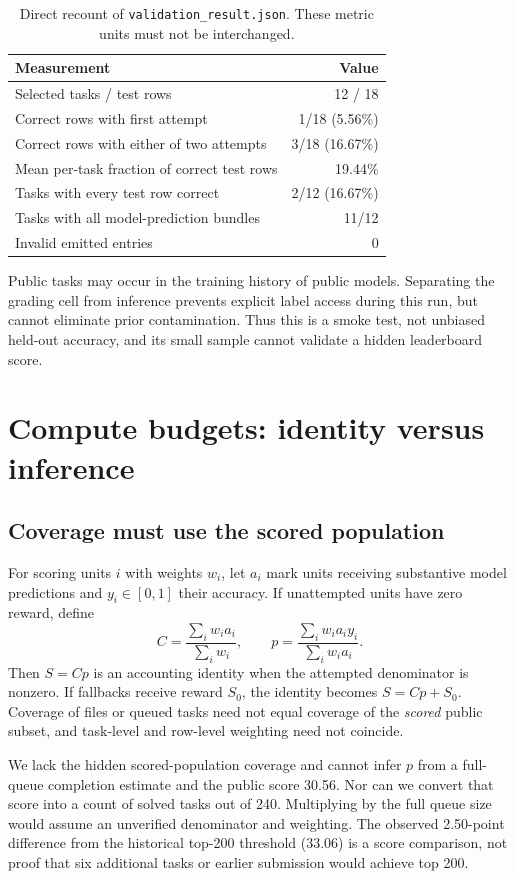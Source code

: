 \documentclass[10pt,a4paper]{article}
\begin{document}
\begin{table}[ht]
\centering
\caption{Direct recount of \texttt{validation\_result.json}. These metric units must not be interchanged.}
\label{tab:smoke}
\begin{tabular}{lr}
\toprule
Measurement & Value\\
\midrule
Selected tasks / test rows & 12 / 18\\
Correct rows with first attempt & 1/18 (5.56\%)\\
Correct rows with either of two attempts & 3/18 (16.67\%)\\
Mean per-task fraction of correct test rows & 19.44\%\\
Tasks with every test row correct & 2/12 (16.67\%)\\
Tasks with all model-prediction bundles & 11/12\\
Invalid emitted entries & 0\\
\bottomrule
\end{tabular}
\end{table}

Public tasks may occur in the training history of public models. Separating the grading cell from inference prevents explicit label access during this run, but cannot eliminate prior contamination. Thus this is a smoke test, not unbiased held-out accuracy, and its small sample cannot validate a hidden leaderboard score.

\section{Compute budgets: identity versus inference}
\subsection{Coverage must use the scored population}
For scoring units $i$ with weights $w_i$, let $a_i$ mark units receiving substantive model predictions and $y_i\in[0,1]$ their accuracy. If unattempted units have zero reward, define
\[
C=\frac{\sum_iw_i a_i}{\sum_iw_i},\qquad
p=\frac{\sum_iw_i a_i y_i}{\sum_iw_i a_i}.
\]
Then $S=Cp$ is an accounting identity when the attempted denominator is nonzero. If fallbacks receive reward $S_0$, the identity becomes $S=Cp+S_0$. Coverage of files or queued tasks need not equal coverage of the \emph{scored} public subset, and task-level and row-level weighting need not coincide.

We lack the hidden scored-population coverage and cannot infer $p$ from a full-queue completion estimate and the public score 30.56. Nor can we convert that score into a count of solved tasks out of 240. Multiplying by the full queue size would assume an unverified denominator and weighting. The observed 2.50-point difference from the historical top-200 threshold (33.06) is a score comparison, not proof that six additional tasks or earlier submission would achieve top 200.
\end{document}
